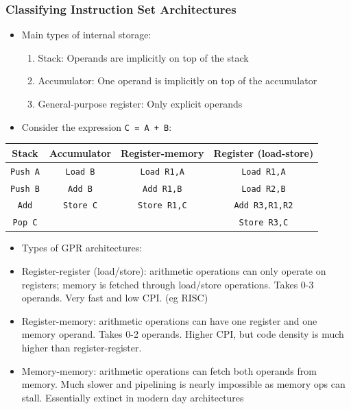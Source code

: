 \subsubsection{Classifying Instruction Set Architectures}
\begin{itemize}
    \item Main types of internal storage:
    \begin{enumerate}
        \item Stack: Operands are implicitly on top of the stack
        \item Accumulator: One operand is implicitly on top of the accumulator
        \item General-purpose register: Only explicit operands
    \end{enumerate}
    \item Consider the expression \texttt{C = A + B}:
\end{itemize}
\begin{center}
\begin{tabular}{c c c c}
\hline
Stack & Accumulator & Register-memory & Register (load-store) \\
\hline 
\hline 
\texttt{Push A}&\texttt{Load B}&\texttt{Load R1,A}&\texttt{Load R1,A}\\
\hline
\texttt{Push B}&\texttt{Add B}&\texttt{Add R1,B}&\texttt{Load R2,B}\\
\hline 
\texttt{Add}&\texttt{Store C}&\texttt{Store R1,C}&\texttt{Add R3,R1,R2}\\
\hline
\texttt{Pop C}&&&\texttt{Store R3,C}\\
\hline
\end{tabular}
\end{center}
\begin{itemize}
  \item Types of GPR architectures:
  \item Register-register (load/store): arithmetic operations can only operate on registers; memory is fetched through load/store operations. Takes 0-3 operands. Very fast and low CPI. (eg RISC)
  \item Register-memory: arithmetic operations can have one register and one memory operand. Takes 0-2 operands. Higher CPI, but code density is much higher than register-register.
  \item Memory-memory: arithmetic operations can fetch both operands from memory. Much slower and pipelining is nearly impossible as memory ops can stall. Essentially extinct in modern day architectures
\end{itemize}
